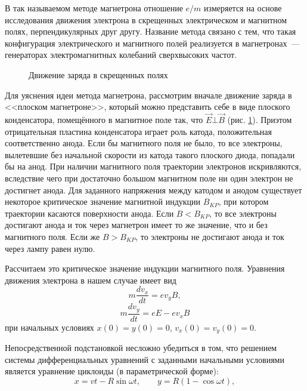 В так называемом {\textsf{методе магнетрона}} отношение $e/m$ измеряется на основе исследования движения электрона в скрещенных электрическом и магнитном полях, перпендикулярных друг другу. Название метода связано с тем, что такая
конфигурация электрического и магнитного полей реализуется в магнетронах~--- генераторах электромагнитных колебаний
сверхвысоких частот.

\begin{figure}
\caption{Движение заряда в скрещенных полях}
\label{fig3.0.3}
\end{figure}

Для уяснения идеи метода магнетрона, рассмотрим вначале движение заряда в <<плоском магнетроне>>, который можно
представить себе в виде плоского конденсатора, помещённого в магнитное поле так, что $\vec{E}\bot\vec{B}$ (рис. \ref{fig3.0.3}). Приэтом отрицательная пластина конденсатора играет роль катода, положительная соответственно анода. Если бы магнитного поля не было, то все электроны, вылетевшие без начальной скорости из катода такого плоского диода, попадали бы на анод. При наличии магнитного поля траектории электронов искривляются, вследствие чего при достаточно большом магнитном поле ни один электрон не достигнет анода. Для заданного напряжения между катодом и анодом существует некоторое критическое значение магнитной индукции $B_{KP}$, при котором траектории касаются поверхности анода. Если $B<B_{KP}$, то все электроны достигают анода и ток через магнетрон имеет то же значение, что и без магнитного поля. Если же $B>B_{KP}$, то электроны не достигают анода и ток через лампу равен нулю.

Рассчитаем это критическое значение индукции магнитного поля. Уравнения движения электрона в нашем случае имеет вид
\begin{equation}
m\frac{dv_x}{dt}=ev_y B,
\label{3MagnElAccX}
\end{equation}
\begin{equation}
m\frac{dv_y}{dt}=eE-ev_x B
\label{3MagnElAccY}
\end{equation}
при начальных условиях $x(0)=y(0)=0$, $v_x(0)=v_y(0)=0$.

Непосредственной подстановкой несложно убедиться в том, что решением системы дифференциальных уравнений с заданными
начальными условиями является уравнение циклоиды (в параметрической форме):
\begin{equation}
x = vt - R\sin\omega t,\qquad y = R(1-\cos\omega t),
\label{3MagnElCoordX}
\end{equation}


